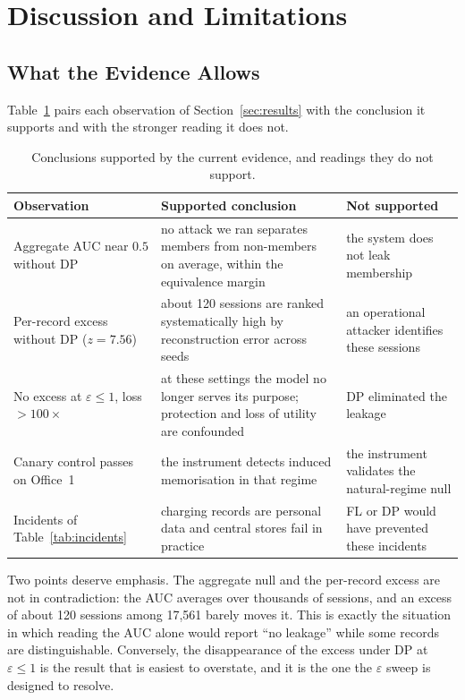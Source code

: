 
\section{Discussion and Limitations}
\label{sec:discussion}

\subsection{What the Evidence Allows}
\label{sec:disc-allowed}

Table~\ref{tab:allowed} pairs each observation of Section~\ref{sec:results}
with the conclusion it supports and with the stronger reading it does not.

\begin{table}[t]
\centering
\caption{Conclusions supported by the current evidence, and readings they do
not support.}
\label{tab:allowed}
\footnotesize
\begin{tabular}{@{}p{4.3cm}p{6.1cm}p{5.6cm}@{}}
\toprule
Observation & Supported conclusion & Not supported \\
\midrule
Aggregate AUC near $0.5$ without DP & no attack we ran separates members from non-members on average, within the equivalence margin & the system does not leak membership \\
Per-record excess without DP ($z = 7.56$) & about 120 sessions are ranked systematically high by reconstruction error across seeds & an operational attacker identifies these sessions \\
No excess at $\varepsilon \le 1$, loss $>100\times$ & at these settings the model no longer serves its purpose; protection and loss of utility are confounded & DP eliminated the leakage \\
Canary control passes on Office~1 & the instrument detects induced memorisation in that regime & the instrument validates the natural-regime null \\
Incidents of Table~\ref{tab:incidents} & charging records are personal data and central stores fail in practice & FL or DP would have prevented these incidents \\
\bottomrule
\end{tabular}
\end{table}

Two points deserve emphasis. The aggregate null and the per-record excess are
not in contradiction: the AUC averages over thousands of sessions, and an
excess of about 120 sessions among 17{,}561 barely moves it. This is exactly
the situation in which reading the AUC alone would report ``no leakage'' while
some records are distinguishable. Conversely, the disappearance of the excess
under DP at $\varepsilon \le 1$ is the result that is easiest to overstate, and
it is the one the $\varepsilon$ sweep is designed to resolve.

